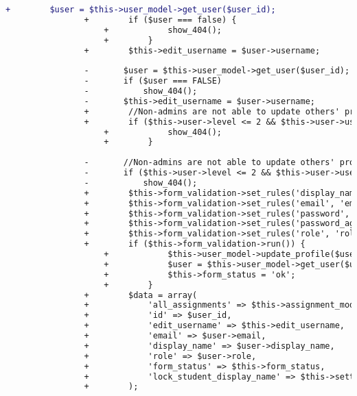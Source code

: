 \begin{lstlisting}[language=diff, caption=Perubahan pada kode Profile.php]
				+        $user = $this->user_model->get_user($user_id);
				+        if ($user === false) {
					+            show_404();
					+        }
				+        $this->edit_username = $user->username;
				
				-		$user = $this->user_model->get_user($user_id);
				-		if ($user === FALSE)
				-			show_404();
				-		$this->edit_username = $user->username;
				+        //Non-admins are not able to update others' profile
				+        if ($this->user->level <= 2 && $this->user->username != $this->edit_username) { // permission denied
					+            show_404();
					+        }
				
				-		//Non-admins are not able to update others' profile
				-		if ($this->user->level <= 2 && $this->user->username != $this->edit_username) // permission denied
				-			show_404();
				+        $this->form_validation->set_rules('display_name', 'name', 'max_length[40]');
				+        $this->form_validation->set_rules('email', 'email address', 'required|max_length[40]|valid_email|callback__email_check', array('_email_check' => 'This %s already exists.'));
				+        $this->form_validation->set_rules('password', 'password', 'callback__password_check', array('_password_check' => 'The %s field must be between 6 and 200 characters in length.'));
				+        $this->form_validation->set_rules('password_again', 'password confirmation', 'callback__password_again_check', array('_password_again_check' => 'The %s field does not match the password field.'));
				+        $this->form_validation->set_rules('role', 'role', 'callback__role_check');
				+        if ($this->form_validation->run()) {
					+            $this->user_model->update_profile($user_id);
					+            $user = $this->user_model->get_user($user_id);
					+            $this->form_status = 'ok';
					+        }
				+        $data = array(
				+            'all_assignments' => $this->assignment_model->all_assignments(),
				+            'id' => $user_id,
				+            'edit_username' => $this->edit_username,
				+            'email' => $user->email,
				+            'display_name' => $user->display_name,
				+            'role' => $user->role,
				+            'form_status' => $this->form_status,
				+            'lock_student_display_name' => $this->settings_model->get_setting(lock_student_display_name),
				+        );
				

\end{lstlisting}
